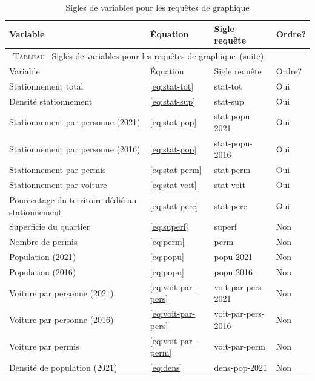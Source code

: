 \newcommand{\TableSiglesAPI}{Sigles de variables pour les requêtes de graphique}
{\captionsetup{justification=centering}
\setlength{\LTcapwidth}{\linewidth} 
\begin{center}
    \begin{longtable}{p{8cm}m{1.5cm}ll}
        \caption{Sigles de variables pour les requêtes de graphique}\label{tab:analysis-var-query-vals}\\
         \toprule
        Variable & Équation & Sigle requête & Ordre? \\
        \midrule
        \endfirsthead
        \multicolumn{3}{c}{\textsc{Tableau}~\thetable{} \TableSiglesAPI\ (suite)}\\[1em]
        \toprule
        Variable & Équation & Sigle requête & Ordre?  \\
        \midrule
        \endhead
        \bottomrule
        \endfoot
        \bottomrule
        \endlastfoot
         Stationnement total & \ref{eq:stat-tot} & stat-tot & Oui\\
         Densité stationnement & \ref{eq:stat-sup} & stat-sup & Oui\\
         Stationnement par personne (2021) & \ref{eq:stat-pop} & stat-popu-2021 & Oui\\
         Stationnement par personne (2016) & \ref{eq:stat-pop} & stat-popu-2016 & Oui\\
         Stationnement par permis & \ref{eq:stat-perm} & stat-perm & Oui\\
         Stationnement par voiture &  \ref{eq:stat-voit}& stat-voit & Oui\\
         Pourcentage du territoire dédié au stationnement & \ref{eq:stat-perc} & stat-perc & Oui\\
         Superficie du quartier & \ref{eq:superf} & superf & Non\\
         Nombre de permis & \ref{eq:perm} & perm & Non\\
         Population (2021) & \ref{eq:popu} & popu-2021 & Non\\
         Population (2016) & \ref{eq:popu} & popu-2016 & Non\\
         Voiture par personne (2021) & \ref{eq:voit-par-pers} & voit-par-pers-2021 & Non\\
         Voiture par personne (2016) &\ref{eq:voit-par-pers} & voit-par-pers-2016 &Non\\
         Voiture par permis & \ref{eq:voit-par-perm} & voit-par-perm &Non\\
         Densité de population (2021) & \ref{eq:dens} & dens-pop-2021 & Non\\

\end{longtable}
\end{center}}
